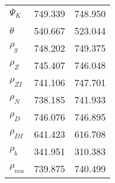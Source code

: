 \begin{center}
\begin{longtable}{lcc}
$ {\Psi_{K}}           $	 & 	     749.339	 & 	     748.950 \\ 
$ {\theta}             $	 & 	     540.667	 & 	     523.044 \\ 
$ {\rho_g}             $	 & 	     748.202	 & 	     749.375 \\ 
$ {\rho_Z}             $	 & 	     745.407	 & 	     746.048 \\ 
$ {\rho_{ZI}}          $	 & 	     741.106	 & 	     747.701 \\ 
$ {\rho_N}             $	 & 	     738.185	 & 	     741.933 \\ 
$ {\rho_D}             $	 & 	     746.076	 & 	     746.895 \\ 
$ {\rho_{DI}}          $	 & 	     641.423	 & 	     616.708 \\ 
$ {\rho_b}             $	 & 	     341.951	 & 	     310.383 \\ 
$ {\rho_{mu}}          $	 & 	     739.875	 & 	     740.499 \\ 
\end{longtable}
 \end{center}
